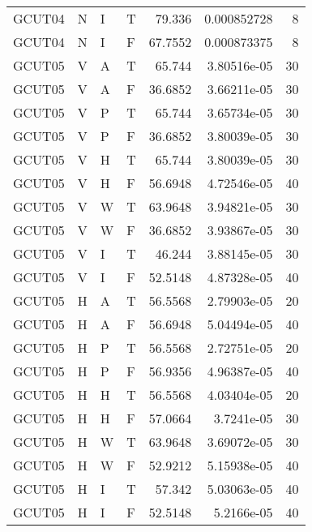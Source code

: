 \begin{longtable}{llllrrr}
    GCUT04   & N     & I     & T          & 79.336     & 0.000852728 & 8        \\
    GCUT04   & N     & I     & F          & 67.7552    & 0.000873375 & 8        \\
    GCUT05   & V     & A     & T          & 65.744     & 3.80516e-05 & 30       \\
    GCUT05   & V     & A     & F          & 36.6852    & 3.66211e-05 & 30       \\
    GCUT05   & V     & P     & T          & 65.744     & 3.65734e-05 & 30       \\
    GCUT05   & V     & P     & F          & 36.6852    & 3.80039e-05 & 30       \\
    GCUT05   & V     & H     & T          & 65.744     & 3.80039e-05 & 30       \\
    GCUT05   & V     & H     & F          & 56.6948    & 4.72546e-05 & 40       \\
    GCUT05   & V     & W     & T          & 63.9648    & 3.94821e-05 & 30       \\
    GCUT05   & V     & W     & F          & 36.6852    & 3.93867e-05 & 30       \\
    GCUT05   & V     & I     & T          & 46.244     & 3.88145e-05 & 30       \\
    GCUT05   & V     & I     & F          & 52.5148    & 4.87328e-05 & 40       \\
    GCUT05   & H     & A     & T          & 56.5568    & 2.79903e-05 & 20       \\
    GCUT05   & H     & A     & F          & 56.6948    & 5.04494e-05 & 40       \\
    GCUT05   & H     & P     & T          & 56.5568    & 2.72751e-05 & 20       \\
    GCUT05   & H     & P     & F          & 56.9356    & 4.96387e-05 & 40       \\
    GCUT05   & H     & H     & T          & 56.5568    & 4.03404e-05 & 20       \\
    GCUT05   & H     & H     & F          & 57.0664    & 3.7241e-05  & 30       \\
    GCUT05   & H     & W     & T          & 63.9648    & 3.69072e-05 & 30       \\
    GCUT05   & H     & W     & F          & 52.9212    & 5.15938e-05 & 40       \\
    GCUT05   & H     & I     & T          & 57.342     & 5.03063e-05 & 40       \\
    GCUT05   & H     & I     & F          & 52.5148    & 5.2166e-05  & 40       \\

\end{longtable}
